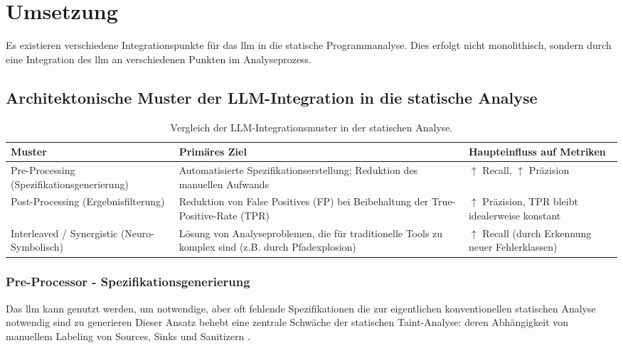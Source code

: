 \documentclass[%
    paper=A4,               %
    ngerman,
    parskip=half,           %
    11pt,                   %
    headings=normal,        %
    bibliography=totoc,     %
    listof=totoc,           %
    chapterprefix=false,    %
    appendixprefix=false,    %
    draft=false,            %
]{scrartcl}%
\begin{document}
\section{Umsetzung}

Es existieren verschiedene Integrationspunkte für das \ac{llm} in die statische Programmanalyse. Dies erfolgt nicht monolithisch, sondern durch eine Integration des \ac{llm} an verschiedenen Punkten im Analyseprozess.


\subsection{Architektonische Muster der LLM-Integration in die statische Analyse}
\begin{table}[ht]
\centering
\begin{tabularx}{\textwidth}{>{\raggedright\arraybackslash}X >{\raggedright\arraybackslash}X >{\raggedright\arraybackslash}X}
\hline
\textbf{Muster} & \textbf{Primäres Ziel} & \textbf{Haupteinfluss auf Metriken} \\
\hline
Pre-Processing (Spezifikationsgenerierung) & Automatisierte Spezifikationserstellung; Reduktion des manuellen Aufwands & $\uparrow$ Recall, $\uparrow$ Präzision \\
\hline
Post-Processing (Ergebnisfilterung) & Reduktion von False Positives (FP) bei Beibehaltung der True-Positive-Rate (TPR) & $\uparrow$ Präzision, TPR bleibt idealerweise konstant \\
\hline
Interleaved / Synergistic (Neuro-Symbolisch) & Lösung von Analyseproblemen, die für traditionelle Tools zu komplex sind (z.B. durch Pfadexplosion) & $\uparrow$ Recall (durch Erkennung neuer Fehlerklassen) \\
\hline
\end{tabularx}
\caption{Vergleich der LLM-Integrationsmuster in der statischen Analyse.}
\label{tab:vergleich_ansaetze}
\end{table}

\subsubsection{Pre-Processor - Spezifikationsgenerierung}
Das \ac{llm} kann genutzt werden, um notwendige, aber oft fehlende Spezifikationen die zur eigentlichen konventionellen statischen Analyse notwendig sind zu generieren Dieser Ansatz behebt eine zentrale Schwäche der statischen Taint-Analyse: deren Abhängigkeit von manuellem Labeling von Sources, Sinks und Sanitizern \cite{liIRISLLMAssistedStatic2024}.
\end{document}
